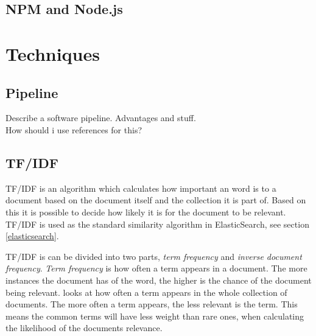 \subsection{NPM and Node.js}

\section{Techniques}

\subsection{Pipeline} \label{pipeline}
Describe a software pipeline. Advantages and stuff.\\
How should i use references for this?

\subsection{TF/IDF} \label{tf/idf}
TF/IDF is an algorithm which calculates how important an word is to a document based on the document itself and the collection it is part of. Based on this it is possible to decide how likely it is for the document to be relevant. TF/IDF is used as the standard similarity algorithm in ElasticSearch, see section \ref{elasticsearch}.

TF/IDF is can be divided into two parts, \textit{term frequency} and \textit{inverse document frequency}. \textit{Term frequency} is how often a term appears in a document. The more instances the document has of the word, the higher is the chance of the document being relevant.  looks at how often a term appears in the whole collection of documents. The more often a term appears, the less relevant is the term. This means the common terms will have less weight than rare ones, when calculating the likelihood of the documents relevance. 

\cleardoublepage
